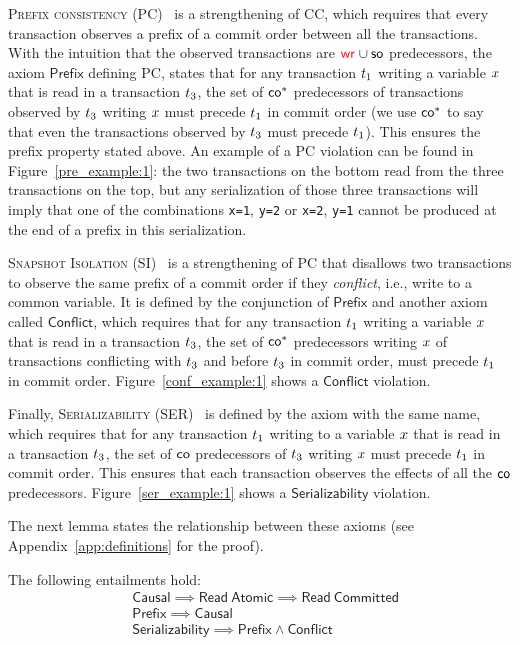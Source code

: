 \textsc{Prefix consistency} (PC)~\cite{DBLP:conf/ecoop/BurckhardtLPF15} is a strengthening of CC, which requires that every transaction observes a prefix of a commit order between all the transactions. With the intuition that the observed transactions are $\textcolor{red}{\mathsf{wr}_{}}\cup\mathsf{so}$ predecessors, the axiom $\mathsf{Prefix}$ defining PC, states that for any transaction ${t}_1$ writing a variable ${x}$ that is read in a transaction ${t}_3$, the set of $\mathsf{co}^*$ predecessors of transactions observed by ${t}_3$ writing ${x}$ must precede ${t}_1$ in commit order (we use $\mathsf{co}^*$ to say that even the transactions observed by ${t}_3$ must precede ${t}_1$). This ensures the prefix property stated above. An example of a PC violation can be found in Figure~\ref{pre_example:1}: the two transactions on the bottom read from the three transactions on the top, but any serialization of those three transactions will imply that one of the combinations {\tt x=1}, {\tt y=2} or {\tt x=2}, {\tt y=1} cannot be produced at the end of a prefix in this serialization.

\textsc{Snapshot Isolation} (SI)~\cite{DBLP:conf/sigmod/BerensonBGMOO95} is a strengthening of PC that disallows two transactions to observe the same prefix of a commit order if they \emph{conflict}, i.e., write to a common variable. It is defined by the conjunction of $\mathsf{Prefix}$ and another axiom called $\mathsf{Conflict}$, which requires that for any transaction ${t}_1$ writing a variable ${x}$ that is read in a transaction ${t}_3$, the set of $\mathsf{co}^*$ predecessors writing ${x}$ of transactions conflicting with ${t}_3$ and before ${t}_3$ in commit order, must precede ${t}_1$ in commit order. Figure~\ref{conf_example:1} shows a $\mathsf{Conflict}$ violation.

Finally, \textsc{Serializability} (SER)~\cite{DBLP:journals/jacm/Papadimitriou79b} is defined by the axiom with the same name, which requires that for any transaction ${t}_1$ writing to a variable ${x}$ that is read in a transaction ${t}_3$, the set of $\mathsf{co}$ predecessors of ${t}_3$ writing ${x}$ must precede ${t}_1$ in commit order. This ensures that each transaction observes the effects of all the $\mathsf{co}$ predecessors. Figure~\ref{ser_example:1} shows a $\mathsf{Serializability}$ violation.

The next lemma states the relationship between these axioms (see Appendix~\ref{app:definitions} for the proof).

\begin{lemma}
 The following entailments hold:
 \begin{align*}
   & \mathsf{Causal} \implies \mathsf{Read\ Atomic}\implies \mathsf{Read\ Committed} \\
   & \mathsf{Prefix} \implies \mathsf{Causal}                                        \\
   & \mathsf{Serializability} \implies \mathsf{Prefix}\land \mathsf{Conflict}        
 \end{align*} 
 \label{axioms-rel}
\end{lemma}

